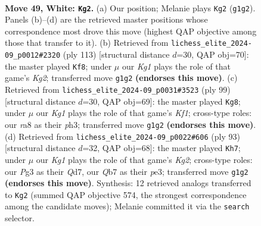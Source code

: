 \documentclass[11pt]{article}
\begin{document}
\clearpage

\begin{figure}[p]\centering
\begin{subfigure}{0.46\textwidth}\centering
\resizebox{\linewidth}{!}{%
\newchessgame
\chessboard[
  setfen={r7/1Q6/4kp2/3p4/5P2/p3q1P1/P6P/6K1 w - - 17 49},
  showmover=false,
  pgfstyle=straightmove, color=movearrow, markmove={g1-g2}
]}
\caption{}
\end{subfigure}\hfill
\begin{subfigure}{0.46\textwidth}\centering
\resizebox{\linewidth}{!}{%
\newchessgame
\chessboard[
  setfen={8/p5k1/6p1/1P2Q2p/7P/6PK/5q2/8 b - - 19 57},
  showmover=false,
  pgfstyle=straightmove, color=movearrow, markmove={g7-f8}
]}
\caption{}
\end{subfigure}
\\[4pt]
\begin{subfigure}{0.46\textwidth}\centering
\resizebox{\linewidth}{!}{%
\newchessgame
\chessboard[
  setfen={5k2/6p1/p2Q3p/Pp6/8/5qPP/5P1K/8 b - - 2 50},
  showmover=false,
  pgfstyle=straightmove, color=movearrow, markmove={f8-g8}
]}
\caption{}
\end{subfigure}\hfill
\begin{subfigure}{0.46\textwidth}\centering
\resizebox{\linewidth}{!}{%
\newchessgame
\chessboard[
  setfen={8/3q1pk1/4p3/4Q1P1/8/4P2p/5PP1/1R4K1 b - - 1 47},
  showmover=false,
  pgfstyle=straightmove, color=movearrow, markmove={g7-h7}
]}
\caption{}
\end{subfigure}
\caption{\textbf{Move 49, White: \texttt{Kg2}.} (a) Our position; Melanie plays \texttt{Kg2} (\texttt{g1g2}). Panels (b)--(d) are the retrieved master positions whose correspondence most drove this move (highest QAP objective among those that transfer to it). (b) Retrieved from \texttt{lichess\_elite\_2024-09\_p0012\#2320} (ply 113) [structural distance $d$=30, QAP obj=70]: the master played \texttt{Kf8}; under $\mu$ our \emph{Kg1} plays the role of that game's \emph{Kg2}; transferred move \texttt{g1g2} \textbf{(endorses this move)}. (c) Retrieved from \texttt{lichess\_elite\_2024-09\_p0031\#3523} (ply 99) [structural distance $d$=30, QAP obj=69]: the master played \texttt{Kg8}; under $\mu$ our \emph{Kg1} plays the role of that game's \emph{Kf1}; cross-type roles: our \emph{r}a8 as their \emph{p}h3; transferred move \texttt{g1g2} \textbf{(endorses this move)}. (d) Retrieved from \texttt{lichess\_elite\_2024-09\_p0022\#606} (ply 93) [structural distance $d$=32, QAP obj=68]: the master played \texttt{Kh7}; under $\mu$ our \emph{Kg1} plays the role of that game's \emph{Kg2}; cross-type roles: our \emph{P}g3 as their \emph{Q}d7, our \emph{Q}b7 as their \emph{p}e3; transferred move \texttt{g1g2} \textbf{(endorses this move)}. Synthesis: 12 retrieved analogs transferred to \texttt{Kg2} (summed QAP objective 574, the strongest correspondence among the candidate moves); Melanie committed it via the \texttt{search} selector.}
\label{fig:thought-m96}
\end{figure}
\end{document}
